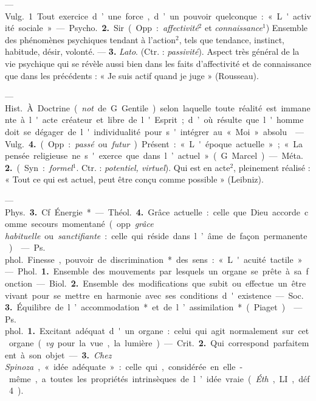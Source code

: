 \begin{itemize}[leftmargin=1cm, label=, itemsep=1pt]
 — \si{Vulg.} 1 Tout exercice
d’une force, d’un pouvoir quelconque : « L'activité sociale ».

— \si{Psycho.} {\bf 2.} Sir. (Opp. : {\it affectivité}$^2$ et {\it connaissance}$^1$) Ensemble
des phénomènes psychiques tendant
à l’action$^2$, tels que tendance, instinct, habitude, désir, volonté. —
 {\bf 3.} {\it Lato}. (Ctr. : {\it passivité}). Aspect
très général de la vie psychique qui
se révèle aussi bien dans les faits
d’affectivité et de connaissance que
dans les précédents : « Je suis actif
quand je juge » (Rousseau).

 — \si{Hist.} À Doctrine ({\it not}.
de G. Gentile) selon laquelle toute
réalité est immanente à l'acte créateur et libre de l'Esprit; d’où résulte
que l'homme doit se dégager de
l'individualité pour s'intégrer au
« Moi » absolu.

 — \si{Vulg.} {\bf 4.} (Opp. : {\it passé} ou
{\it futur}). Présent : « L'époque actuelle » ;
« La pensée religieuse ne s'exerce que
dans l’actuel » (G. Marcel).

— \si{Méta.} {\bf 2.} (Syn. : {\it formel}$^1$. Ctr. :
{\it potentiel, virtuel}). Qui est en acte$^2$,
pleinement réalisé : « Tout ce qui est
actuel, peut être conçu comme possible » (Leibniz).

— \si{Phys.} {\bf 3.} Cf. Énergie*.

— \si{Théol.} {\bf 4.} Grâce actuelle : celle
que Dieu accorde comme secours
momentané (opp. {\it grâce habituelle} ou
{\it sanctifiante} : celle qui réside dans
l’âme de façon permanente).

 — \si{Ps. phol.} Finesse,
pouvoir de discrimination* des sens :
« L'acuité tactile ».

 — \si{Phol.} {\bf 1.} Ensemble des
mouvements par lesquels un organe
se prête à sa fonction.

— \si{Biol.} {\bf 2.} Ensemble des modifications que subit ou effectue un être
vivant pour se mettre en harmonie
avec ses conditions d'existence.

— \si{Soc.} {\bf 3.} Équilibre de l’accommodation* et de l’assimilation* (Piaget).

 — \si{Ps. phol.} {\bf 1.} Excitant adéquat d'un organe : celui qui agit
normalement sur cet organe ({\it vg}.
pour la vue, la lumière).

— \si{Crit.} {\bf 2.} Qui correspond parfaitement à son objet. — {\bf 3.} {\it Chez
Spinoza}, « idée adéquate » : celle qui,
considérée en elle-même, a toutes
les propriétés intrinsèques de l’idée
vraie ({\it Éth}., LI, déf. 4).


\end{itemize}
